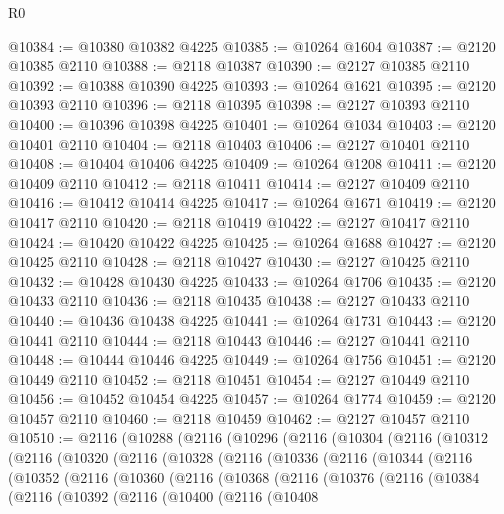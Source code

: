 \begin{lexlean}{R0}
\begin{coremodule}
@10384 := @10380 @10382 @4225
@10385 := @10264 @1604
@10387 := @2120 @10385 @2110
@10388 := @2118 @10387
@10390 := @2127 @10385 @2110
@10392 := @10388 @10390 @4225
@10393 := @10264 @1621
@10395 := @2120 @10393 @2110
@10396 := @2118 @10395
@10398 := @2127 @10393 @2110
@10400 := @10396 @10398 @4225
@10401 := @10264 @1034
@10403 := @2120 @10401 @2110
@10404 := @2118 @10403
@10406 := @2127 @10401 @2110
@10408 := @10404 @10406 @4225
@10409 := @10264 @1208
@10411 := @2120 @10409 @2110
@10412 := @2118 @10411
@10414 := @2127 @10409 @2110
@10416 := @10412 @10414 @4225
@10417 := @10264 @1671
@10419 := @2120 @10417 @2110
@10420 := @2118 @10419
@10422 := @2127 @10417 @2110
@10424 := @10420 @10422 @4225
@10425 := @10264 @1688
@10427 := @2120 @10425 @2110
@10428 := @2118 @10427
@10430 := @2127 @10425 @2110
@10432 := @10428 @10430 @4225
@10433 := @10264 @1706
@10435 := @2120 @10433 @2110
@10436 := @2118 @10435
@10438 := @2127 @10433 @2110
@10440 := @10436 @10438 @4225
@10441 := @10264 @1731
@10443 := @2120 @10441 @2110
@10444 := @2118 @10443
@10446 := @2127 @10441 @2110
@10448 := @10444 @10446 @4225
@10449 := @10264 @1756
@10451 := @2120 @10449 @2110
@10452 := @2118 @10451
@10454 := @2127 @10449 @2110
@10456 := @10452 @10454 @4225
@10457 := @10264 @1774
@10459 := @2120 @10457 @2110
@10460 := @2118 @10459
@10462 := @2127 @10457 @2110
@10510 := @2116
    (@10288
      (@2116
        (@10296
          (@2116
            (@10304
              (@2116
                (@10312
                  (@2116
                    (@10320
                      (@2116
                        (@10328
                          (@2116
                            (@10336
                              (@2116
                                (@10344
                                  (@2116
                                    (@10352
                                      (@2116
                                        (@10360
                                          (@2116
                                            (@10368
                                              (@2116
                                                (@10376
                                                  (@2116
                                                    (@10384
                                                      (@2116
                                                        (@10392
                                                          (@2116
                                                            (@10400
                                                              (@2116
                                                                (@10408

\end{coremodule}
\end{lexlean}
